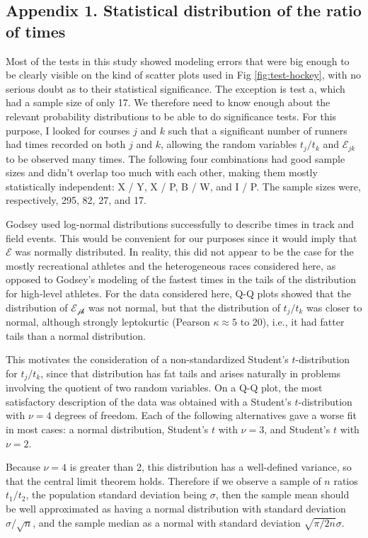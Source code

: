 \documentclass[10pt,letterpaper]{article}
\begin{document}
\subsection*{Appendix 1. Statistical distribution of the ratio of times}

Most of the tests in this study showed modeling errors that were big enough to be clearly
visible on the kind of scatter plots used in Fig \ref{fig:test-hockey}, with no serious doubt
as to their statistical significance. The exception is test a, which had a sample size of
only 17. We therefore need to know enough about the relevant probability distributions to
be able to do significance tests. For this purpose, I looked for courses $j$ and $k$ such
that a significant number of runners had times recorded on both $j$ and $k$, allowing
the random variables $t_j/t_k$ and $\mathcal{E}_{jk}$ to be observed many times. The following four
combinations had good sample sizes and didn't overlap too much with each other, making them
mostly statistically independent: X / Y, X / P, B / W, and I / P. The sample sizes were,
respectively, 295, 82, 27, and 17.

Godsey\cite{godsey} used log-normal distributions successfully to describe times in track and
field events. This would be convenient for our purposes since it would imply that $\mathcal{E}$
was normally distributed. In reality, this did not appear to be the case for the mostly recreational
athletes and the heterogeneous races considered here, as opposed to Godsey's modeling of
the fastest times in the tails of the distribution for high-level athletes. For the data considered here,
Q-Q plots showed that the distribution of $\mathcal{E_{jk}}$ was not normal, but that
the distribution of $t_j/t_k$ was closer to normal, although strongly leptokurtic
(Pearson $\kappa\approx 5$ to 20), i.e., it had fatter tails than a normal distribution.

This motivates the consideration of a non-standardized Student's $t$-distribution for $t_j/t_k$, since that
distribution has fat tails and arises naturally in problems involving the quotient of two random variables.
On a Q-Q plot, the most satisfactory description of the data was obtained with a Student's
$t$-distribution with $\nu=4$ degrees of freedom.
Each of the following alternatives gave a worse fit in most cases: a normal distribution,
Student's $t$ with $\nu=3$, and Student's $t$ with $\nu=2$.

Because $\nu=4$ is greater than 2, this distribution has a well-defined variance, so that
the central limit theorem holds. Therefore if we observe a sample of $n$ ratios $t_1/t_2$,
the population standard deviation being $\sigma$, then the sample mean should be well
approximated as having a normal distribution with standard deviation $\sigma/\sqrt{n}$,
and the sample median as a normal with standard deviation $\sqrt{\pi/2n}\sigma$.



\end{document}
